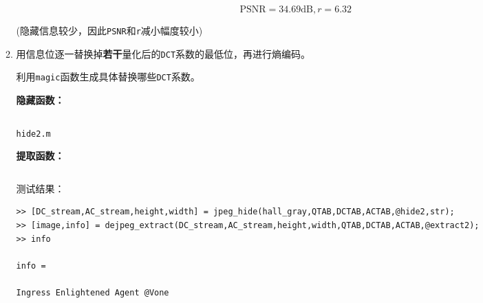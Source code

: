 \documentclass{article}
\numberwithin{figure}{section}
\numberwithin{table}{section}
\numberwithin{listing}{section}
\numberwithin{equation}{section}
\begin{document}
\begin{enumerate}
\begin{enumerate}
                        $$\textrm{PSNR}=34.69\textrm{dB}, r=6.32$$

                        (隐藏信息较少，因此\texttt{PSNR}和\texttt{r}减小幅度较小)

                    \item 用信息位逐一替换掉\textbf{若干}量化后的\texttt{DCT}系数的最低位，再进行熵编码。

                        利用\texttt{magic}函数生成具体替换哪些\texttt{DCT}系数。

                        \textbf{隐藏函数：}
                        \begin{listing}[H]
                            \inputminted{matlab}{../hide2.m}
                            \caption{\texttt{hide2.m}}
                        \end{listing}

                        \textbf{提取函数：}
                        \inputminted{matlab}{../extract2.m}
                        \begingroup
                        \endgroup

                        测试结果：

                        \begin{verbatim}
>> [DC_stream,AC_stream,height,width] = jpeg_hide(hall_gray,QTAB,DCTAB,ACTAB,@hide2,str);
>> [image,info] = dejpeg_extract(DC_stream,AC_stream,height,width,QTAB,DCTAB,ACTAB,@extract2);
>> info

info =

Ingress Enlightened Agent @Vone 
                        \end{verbatim}


\end{enumerate}
\end{enumerate}
\end{document}
